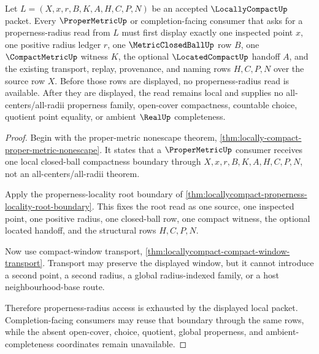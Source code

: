 \begin{theorem}
\label{thm:locallycompact-local-properness-radius-exhaustion}
Let $L=(X,x,r,B,K,A,H,C,P,N)$ be an accepted $\LocallyCompactUp$ packet. Every $\ProperMetricUp$ or completion-facing consumer that asks for a properness-radius read from $L$ must first display exactly one inspected point $x$, one positive radius ledger $r$, one $\MetricClosedBallUp$ row $B$, one $\CompactMetricUp$ witness $K$, the optional $\LocatedCompactUp$ handoff $A$, and the existing transport, replay, provenance, and naming rows $H,C,P,N$ over the source row $X$. Before those rows are displayed, no properness-radius read is available. After they are displayed, the read remains local and supplies no all-centers/all-radii properness family, open-cover compactness, countable choice, quotient point equality, or ambient $\RealUp$ completeness.
\end{theorem}
\begin{proof}
Begin with the proper-metric nonescape theorem, \autoref{thm:locally-compact-proper-metric-nonescape}. It states that a $\ProperMetricUp$ consumer receives one local closed-ball compactness boundary through $X,x,r,B,K,A,H,C,P,N$, not an all-centers/all-radii theorem.

Apply the properness-locality root boundary of \autoref{thm:locallycompact-properness-locality-root-boundary}. This fixes the root read as one source, one inspected point, one positive radius, one closed-ball row, one compact witness, the optional located handoff, and the structural rows $H,C,P,N$.

Now use compact-window transport, \autoref{thm:locallycompact-compact-window-transport}. Transport may preserve the displayed window, but it cannot introduce a second point, a second radius, a global radius-indexed family, or a host neighbourhood-base route.

Therefore properness-radius access is exhausted by the displayed local packet. Completion-facing consumers may reuse that boundary through the same rows, while the absent open-cover, choice, quotient, global properness, and ambient-completeness coordinates remain unavailable.
\end{proof}

